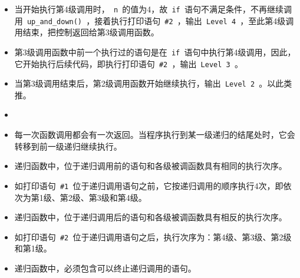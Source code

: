 \begin{frame}[fragile]
\begin{itemize}
\item 当开始执行第4级调用时，\lstinline| n |的值为4，故\lstinline| if |语句不满足条件，不再继续调用\lstinline| up_and_down() |，接着执行打印语句\lstinline| #2 |，输出\lstinline| Level 4 |，至此第4级调用结束，把控制返回给第3级调用函数。\\[0.1in]
\item 第3级调用函数中前一个执行过的语句是在\lstinline| if |语句中执行第4级调用，因此，它开始执行后续代码，即执行打印语句\lstinline| #2 |，输出\lstinline| Level 3 |。\\[0.1in]
\item 当第3级调用结束后，第2级调用函数开始继续执行，输出\lstinline| Level 2 |。以此类推。
\end{itemize}
\end{frame}

\begin{frame}[fragile]
\begin{itemize}
\item
{}\\[0.1in]
\item
每一次函数调用都会有一次返回。当程序执行到某一级递归的结尾处时，它会转移到前一级递归继续执行。
\end{itemize}
\end{frame}

\begin{frame}[fragile]
\begin{itemize}
\item
递归函数中，位于递归调用前的语句和各级被调函数具有相同的执行次序。\\[0.1in]
\item[] 如打印语句\lstinline| #1 |位于递归调用语句之前，它按递归调用的顺序执行4次，即依次为第1级、第2级、第3级和第4级。\\[0.1in]
\item 
递归函数中，位于递归调用后的语句和各级被调函数具有相反的执行次序。\\[0.1in]
\item[] 
如打印语句\lstinline| #2 |位于递归调用语句之后，执行次序为：第4级、第3级、第2级和第1级。
\end{itemize}
\end{frame}

\begin{frame}[fragile]
\begin{itemize}
\item 递归函数中，必须包含可以终止递归调用的语句。
\end{itemize}

\end{frame}

